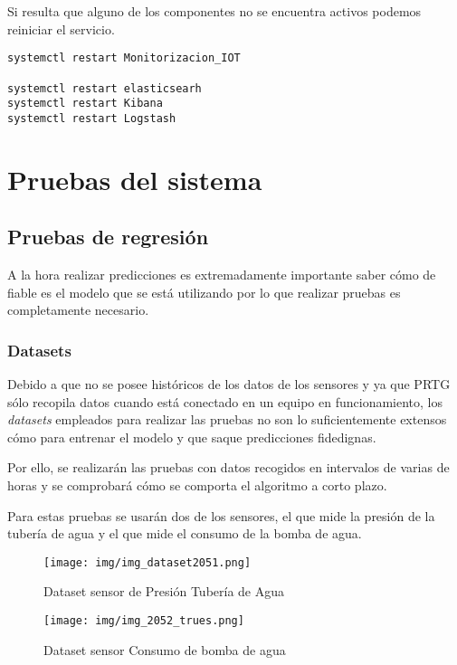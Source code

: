 Si resulta que alguno de los componentes no se encuentra activos podemos reiniciar el servicio.

\begin{lstlisting}[frame=single]  
systemctl restart Monitorizacion_IOT

systemctl restart elasticsearh
systemctl restart Kibana
systemctl restart Logstash
\end{lstlisting}

\section{Pruebas del sistema}

\subsection{Pruebas de regresión}

A la hora realizar predicciones es extremadamente importante saber cómo de fiable es el modelo que se está utilizando por lo que realizar pruebas es completamente necesario.


\subsubsection{Datasets}
Debido a que no se posee históricos de los datos de los sensores y ya que PRTG sólo recopila datos cuando está conectado en un equipo en funcionamiento, los \textit{datasets} empleados para realizar las pruebas no son lo suficientemente extensos cómo para entrenar el modelo y que saque predicciones fidedignas. 

Por ello, se realizarán las pruebas con datos recogidos en intervalos de varias de horas y se comprobará cómo se comporta el algoritmo a corto plazo.

Para estas pruebas se usarán dos de los sensores, el que mide la presión de la tubería de agua y el que mide el consumo de la bomba de agua.

\begin{figure}[h]
	\centering
	\texttt{[image: img/img\_dataset2051.png]}
	\caption{Dataset sensor de Presión Tubería de Agua}
	\label{img_prediccion_sensor2051}
\end{figure}

\begin{figure}[h]
	\centering
	\texttt{[image: img/img\_2052\_trues.png]}
	\caption{Dataset sensor Consumo de bomba de agua}
	\label{img_prediccion_sensor2051}
\end{figure}

